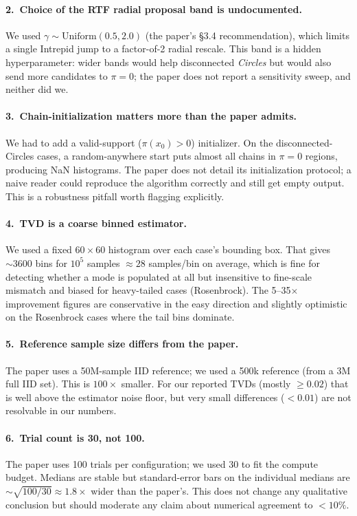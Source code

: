 \documentclass[11pt]{article}
\begin{document}
\paragraph{2.\ Choice of the RTF radial proposal band is undocumented.}
We used $\gamma \sim \mathrm{Uniform}(0.5, 2.0)$ (the paper's \S3.4
recommendation), which limits a single Intrepid jump to a factor-of-2
radial rescale. This band is a hidden hyperparameter: wider bands would
help disconnected \emph{Circles} but would also send more candidates to
$\pi{=}0$; the paper does not report a sensitivity sweep, and neither did we.

\paragraph{3.\ Chain-initialization matters more than the paper admits.}
We had to add a valid-support ($\pi(x_0) > 0$) initializer. On the
disconnected-Circles cases, a random-anywhere start puts almost all chains in
$\pi{=}0$ regions, producing NaN histograms. The paper does not detail its
initialization protocol; a naive reader could reproduce the algorithm
correctly and still get empty output. This is a robustness pitfall worth
flagging explicitly.

\paragraph{4.\ TVD is a coarse binned estimator.}
We used a fixed $60 \times 60$ histogram over each case's bounding box.
That gives $\sim 3600$ bins for $10^5$ samples $\approx 28$ samples/bin on
average, which is fine for detecting whether a mode is populated at all but
insensitive to fine-scale mismatch and biased for heavy-tailed cases
(Rosenbrock). The 5--35$\times$ improvement figures are conservative in the
easy direction and slightly optimistic on the Rosenbrock cases where the tail
bins dominate.

\paragraph{5.\ Reference sample size differs from the paper.}
The paper uses a 50M-sample IID reference; we used a 500k reference (from a
3M full IID set). This is $100\times$ smaller. For our reported TVDs
(mostly $\ge 0.02$) that is well above the estimator noise floor, but very
small differences ($< 0.01$) are not resolvable in our numbers.

\paragraph{6.\ Trial count is 30, not 100.}
The paper uses 100 trials per configuration; we used 30 to fit the compute
budget. Medians are stable but standard-error bars on the individual
medians are $\sim \sqrt{100/30} \approx 1.8\times$ wider than the paper's.
This does not change any qualitative conclusion but should moderate any
claim about numerical agreement to $< 10\%$.
\end{document}
